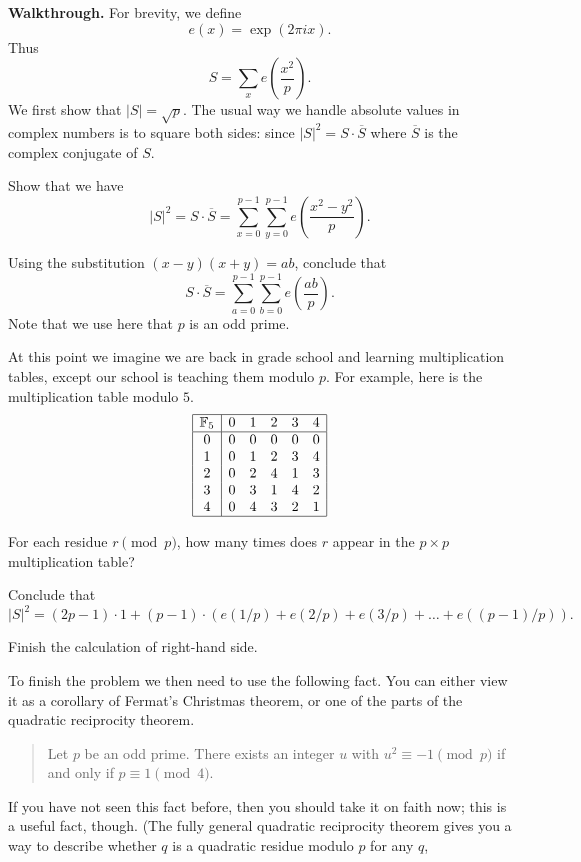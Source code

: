 \documentclass[11pt]{scrartcl}
\providecommand{\ol}{\overline}
\providecommand{\FF}{\mathbb F}
\providecommand{\ii}{\item}
\newenvironment{walkthrough}{\noindent\textbf{\color{green!40!black}Walkthrough.}}{}
\begin{document}
\begin{walkthrough}
For brevity, we define \[ e(x) = \exp(2\pi i x). \]
Thus
\[ S = \sum_x e\left( \frac{x^2}{p} \right). \]
We first show that $|S| = \sqrt p$.
The usual way we handle absolute values in complex numbers
is to square both sides:
since $|S|^2 = S \cdot \ol S$ where $\ol S$
is the complex conjugate of $S$.
\begin{walk}
  \ii Show that we have
  \[ |S|^2 = S \cdot \ol S = \sum_{x=0}^{p-1} \sum_{y=0}^{p-1}
    e\left( \frac{x^2-y^2}{p} \right).  \]
  \ii Using the substitution $(x-y)(x+y) = ab$,
  conclude that
  \[ S \cdot \ol S
    = \sum_{a=0}^{p-1} \sum_{b=0}^{p-1} e\left( \frac{ab}{p} \right). \]
  Note that we use here that $p$ is an odd prime.
\end{walk}
At this point we imagine we are back in grade school
and learning multiplication tables,
except our school is teaching them modulo $p$.
For example, here is the multiplication table modulo $5$.
\[
  \begin{array}{|c|ccccc|}
    \hline
    \FF_5 & 0 & 1 & 2 & 3 & 4 \\
    \hline
    0 & 0 & 0 & 0 & 0 & 0 \\
    1 & 0 & 1 & 2 & 3 & 4 \\
    2 & 0 & 2 & 4 & 1 & 3 \\
    3 & 0 & 3 & 1 & 4 & 2 \\
    4 & 0 & 4 & 3 & 2 & 1 \\
    \hline
  \end{array}
\]
\begin{walk}[resume]
  \ii For each residue $r \pmod p$,
  how many times does $r$ appear in the $p \times p$ multiplication table?
  \ii Conclude that
  \[ |S|^2 = (2p-1) \cdot 1
    + (p-1) \cdot \left( e(1/p) + e(2/p) + e(3/p) + \dots
      + e( (p-1) / p ) \right).  \]
  \ii Finish the calculation of right-hand side.
\end{walk}
To finish the problem we then need to use the following fact.
You can either view it as a corollary of Fermat's Christmas theorem,
or one of the parts of the quadratic reciprocity theorem.
\begin{quote}
  Let $p$ be an odd prime.
  There exists an integer $u$ with $u^2 \equiv -1 \pmod p$
  if and only if $p \equiv 1 \pmod 4$.
\end{quote}
If you have not seen this fact before, then you should
take it on faith now; this is a useful fact, though.
(The fully general quadratic reciprocity theorem gives you a way to describe
whether $q$ is a quadratic residue modulo $p$ for any $q$,

\end{walkthrough}
\end{document}

